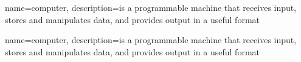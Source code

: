 
  {
	{
		name={computer},
		description={is a programmable machine that receives input,
			stores and manipulates data, and provides
			output in a useful format}
	}
	

 }	
 {}
  {%
	{
		name={computer},
		description={is a programmable machine that receives input,
			stores and manipulates data, and provides
			output in a useful format}
	}
  }
{
}